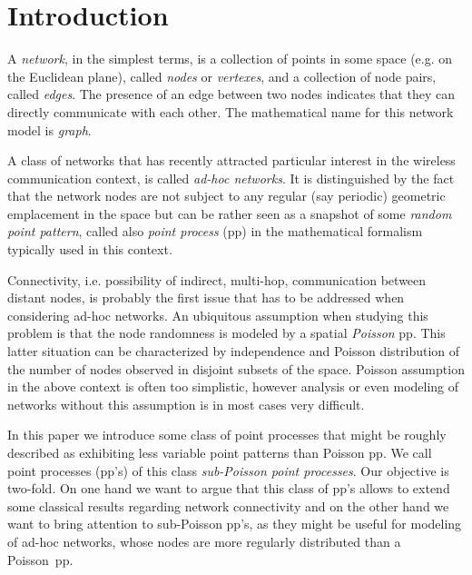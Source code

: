 \documentclass[conference]{IEEEtran}
\begin{document}
\vspace{-2ex}\section{Introduction}
A {\em network}, in the simplest terms, 
is a collection of points in some space (e.g. on the Euclidean plane),
called {\em nodes} or {\em vertexes}, 
and a collection of node pairs, called {\em edges}. 
The presence of an edge between two nodes indicates that they can
directly communicate with each other.
The mathematical name for this network model is {\em graph}.

A class of networks that has
recently attracted particular interest in the wireless communication context, 
is called {\em ad-hoc networks}. It is distinguished  by the fact that
the network  nodes  are not subject to any regular (say periodic) 
geometric emplacement in the space
but can be rather seen as a snapshot
of some {\em random point pattern}, called  also {\em point process}
(pp)  in
the mathematical formalism typically used in this context.

Connectivity, i.e.  possibility of indirect, multi-hop,
communication between distant  
nodes,  is probably the first issue that has to be addressed
when considering ad-hoc networks.
An ubiquitous assumption when studying this problem 
is that the node  randomness is modeled by a
spatial  {\em Poisson} pp. This latter situation can be
characterized by independence and Poisson distribution of the number
of nodes observed in disjoint subsets of the space.  
Poisson assumption  in the above context is often too simplistic,
however analysis or even modeling of networks without this assumption 
is in most cases very difficult.

In this paper we  introduce some class of point
processes that might be roughly described as exhibiting 
less variable point patterns than Poisson pp. 
We call point processes (pp's) 
of this class {\em sub-Poisson point processes}. 
Our objective is two-fold. On one hand we want to argue that this class of pp's allows to 
extend some classical results regarding network connectivity
and on the other hand we want to bring  attention to sub-Poisson pp's, 
as they  might be useful for modeling of ad-hoc networks, 
whose nodes are more regularly distributed than a Poisson~pp.
\end{document}
